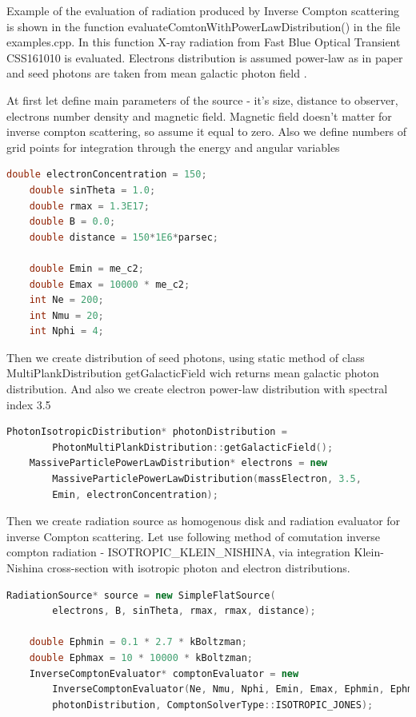 Example of the evaluation of radiation produced by Inverse Compton scattering is shown in the function  evaluateComtonWithPowerLawDistribution() in the file examples.cpp. In this function X-ray radiation from Fast Blue Optical Transient CSS161010 is evaluated. Electrons distribution is assumed power-law as in paper \cite{Coppejans2020} and seed photons are taken from mean galactic photon field \cite{Mathis1983}.

At first let define main parameters of the source - it's size, distance to observer, electrons number density and magnetic field. Magnetic field doesn't matter for inverse compton scattering, so assume it equal to zero. Also we define numbers of grid points for integration through the energy and angular variables

\begin{lstlisting}[language=c++]
	double electronConcentration = 150;
	double sinTheta = 1.0;
	double rmax = 1.3E17;
	double B = 0.0;
	double distance = 150*1E6*parsec;
	
	double Emin = me_c2;
	double Emax = 10000 * me_c2;
	int Ne = 200;
	int Nmu = 20;
	int Nphi = 4;
\end{lstlisting}

Then we create distribution of seed photons, using static method of class MultiPlankDistribution getGalacticField wich returns mean galactic photon distribution. And also we create electron power-law distribution with spectral index 3.5

\begin{lstlisting}[language=c++]
	PhotonIsotropicDistribution* photonDistribution = 
	    PhotonMultiPlankDistribution::getGalacticField();
	MassiveParticlePowerLawDistribution* electrons = new 
	    MassiveParticlePowerLawDistribution(massElectron, 3.5,
	    Emin, electronConcentration);
\end{lstlisting}

Then we create radiation source as homogenous disk and radiation evaluator for inverse Compton scattering. Let use following method of comutation inverse compton radiation - ISOTROPIC\_KLEIN\_NISHINA, via integration Klein-Nishina cross-section with isotropic photon and electron distributions.

\begin{lstlisting}[language=c++]
    RadiationSource* source = new SimpleFlatSource(
        electrons, B, sinTheta, rmax, rmax, distance);
	
    double Ephmin = 0.1 * 2.7 * kBoltzman;
    double Ephmax = 10 * 10000 * kBoltzman;
    InverseComptonEvaluator* comptonEvaluator = new 
        InverseComptonEvaluator(Ne, Nmu, Nphi, Emin, Emax, Ephmin, Ephmax, 
        photonDistribution, ComptonSolverType::ISOTROPIC_JONES);

\end{lstlisting}

